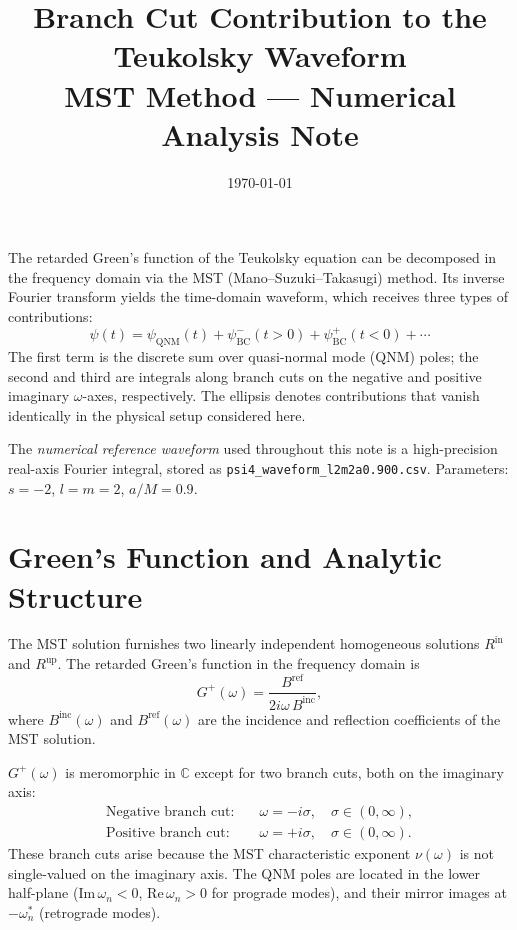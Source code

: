 \documentclass[12pt,a4paper]{article}
\title{Branch Cut Contribution to the Teukolsky Waveform\\
\large MST Method --- Numerical Analysis Note}
\author{}
\date{\today}
\newcommand{\Binc}{B^{\mathrm{inc}}}
\newcommand{\Bref}{B^{\mathrm{ref}}}
\newcommand{\psiQNM}{\psi_{\mathrm{QNM}}}
\begin{document}
\maketitle
\bigskip


The retarded Green's function of the Teukolsky equation can be decomposed
in the frequency domain via the MST (Mano--Suzuki--Takasugi) method.
Its inverse Fourier transform yields the time-domain waveform,
which receives three types of contributions:
\begin{equation}
  \psi(t) = \psiQNM(t) + \psi_{\mathrm{BC}}^{-}(t>0)
            + \psi_{\mathrm{BC}}^{+}(t<0) + \cdots
  \label{eq:decomp}
\end{equation}
The first term is the discrete sum over quasi-normal mode (QNM) poles;
the second and third are integrals along branch cuts on the negative and
positive imaginary $\omega$-axes, respectively.
The ellipsis denotes contributions that vanish identically in the
physical setup considered here.

The \emph{numerical reference waveform} used throughout this note is a
high-precision real-axis Fourier integral, stored as
\texttt{psi4\_waveform\_l2m2a0.900.csv}.
Parameters: $s=-2$, $l=m=2$, $a/M=0.9$.

\section{Green's Function and Analytic Structure}

The MST solution furnishes two linearly independent homogeneous solutions
$R^{\mathrm{in}}$ and $R^{\mathrm{up}}$.
The retarded Green's function in the frequency domain is
\begin{equation}
  G^+(\omega) = \frac{\Bref}{2i\omega\,\Binc},
  \label{eq:G}
\end{equation}
where $\Binc(\omega)$ and $\Bref(\omega)$ are the incidence and reflection
coefficients of the MST solution.

$G^+(\omega)$ is meromorphic in $\mathbb{C}$ except for two branch cuts,
both on the imaginary axis:
\begin{align}
  \text{Negative branch cut:} &\quad \omega = -i\sigma,\quad \sigma \in (0,\infty), \label{eq:cut_neg}\\
  \text{Positive branch cut:} &\quad \omega = +i\sigma,\quad \sigma \in (0,\infty). \label{eq:cut_pos}
\end{align}
These branch cuts arise because the MST characteristic exponent $\nu(\omega)$
is not single-valued on the imaginary axis.
The QNM poles are located in the lower half-plane
($\mathrm{Im}\,\omega_n < 0$, $\mathrm{Re}\,\omega_n > 0$ for prograde modes),
and their mirror images at $-\omega_n^*$ (retrograde modes).
\end{document}

